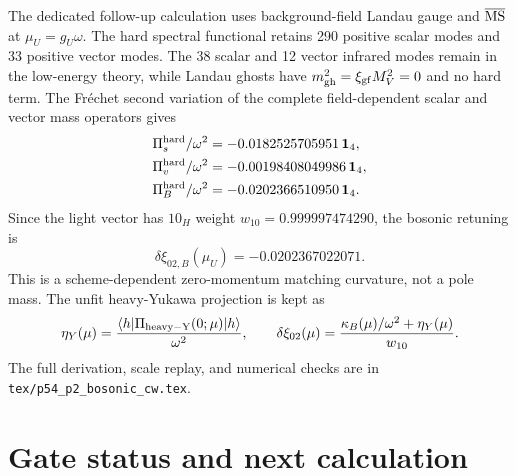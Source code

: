 \documentclass[11pt]{article}
\begin{document}
The dedicated follow-up calculation uses background-field Landau gauge and
$\overline{\rm MS}$ at $\mu_U=g_U\omega$.  The hard spectral functional
retains 290 positive scalar modes and 33 positive vector modes.  The 38
scalar and 12 vector infrared modes remain in the low-energy theory, while
Landau ghosts have $m_{\rm gh}^2=\xi_{\rm gf}M_V^2=0$ and no hard term.  The
Fr\'echet second variation of the complete field-dependent scalar and vector
mass operators gives
\begin{align}
 \Pi_s^{\rm hard}/\omega^2&=-0.0182525705951\,\bm1_4,\nonumber\\
 \Pi_v^{\rm hard}/\omega^2&=-0.00198408049986\,\bm1_4,\nonumber\\
 \Pi_B^{\rm hard}/\omega^2&=-0.0202366510950\,\bm1_4.
 \label{eq:cwaddendum}
\end{align}
Since the light vector has $10_H$ weight
$w_{10}=0.999997474290$, the bosonic retuning is
\begin{equation}
 \delta\xi_{02,B}(\mu_U)=-0.0202367022071.
 \label{eq:cwretune}
\end{equation}
This is a scheme-dependent zero-momentum matching curvature, not a pole
mass.  The unfit heavy-Yukawa projection is kept as
\begin{equation}
 \eta_Y(\mu)=\frac{\langle h|\Pi_{\rm heavy-Y}(0;\mu)|h\rangle}{\omega^2},
 \qquad
 \delta\xi_{02}(\mu)=
 \frac{\kappa_B(\mu)/\omega^2+\eta_Y(\mu)}{w_{10}}.
 \label{eq:yukawanuisance}
\end{equation}
The full derivation, scale replay, and numerical checks are in
\texttt{tex/p54\_p2\_bosonic\_cw.tex}.

\section{Gate status and next calculation}
\end{document}
